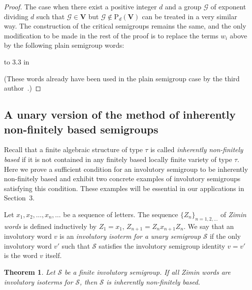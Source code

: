 \documentclass[11pt,reqno]{amsart}
\numberwithin{equation}{section}
\newtheorem{Thm}{Theorem}[section]
\theoremstyle{remark}
\def\Vc{\mathbf{V}}
\def\P{\mathrm P\!}
\begin{document}
\begin{proof}
\smallskip

The case when there exist a positive integer $d$ and a group
$\mathcal{G}$ of exponent dividing $d$ such that
$\mathcal{G}\in\Vc$ but $\mathcal{G}\notin\P_d(\Vc)$ can be
treated in a very similar way. The construction of the critical
semigroups remains the same, and the only modification to be made
in the rest of the proof is to replace the terms $w_i$ above by
the following plain semigroup words:

\smallskip

 

\hbox to 3.3 in {\dotfill }


\smallskip

\noindent (These words already have been used in the plain
semigroup case by the third author~\cite{V}.)
\end{proof}

\subsection{A unary version of the method of inherently
non-finitely based semigroups} Recall that a finite algebraic structure of type $\tau$ is called \emph{inherently
non-finitely based} if it is not contained in any finitely based locally finite variety of type $\tau$. Here we prove a
sufficient condition for an involutory semigroup to be inherently non-finitely based and exhibit two concrete examples
of involutory semigroups satisfying this condition. These examples will be essential in our applications in Section~3.

Let $x_1,x_2,\dots,x_n,\dots$ be a sequence of letters. The
sequence $\{Z_n\}_{n=1,2,\dots}$ of \emph{Zimin words} is defined
inductively by $Z_1=x_1$, $Z_{n+1}=Z_nx_{n+1}Z_n$. We say that an
involutory word $v$ is an \emph{involutory isoterm for a unary
semigroup $\mathcal{S}$} if the only involutory word $v'$ such
that $\mathcal{S}$ satisfies the involutory semigroup identity
$v=v'$ is the word $v$ itself.

\begin{Thm}
\label{Theorem 2.2} Let $\mathcal{S}$ be a finite involutory
semigroup. If all Zimin words are involutory isoterms for
$\mathcal{S}$, then $\mathcal{S}$ is inherently non-finitely
based.
\end{Thm}
\end{document}
